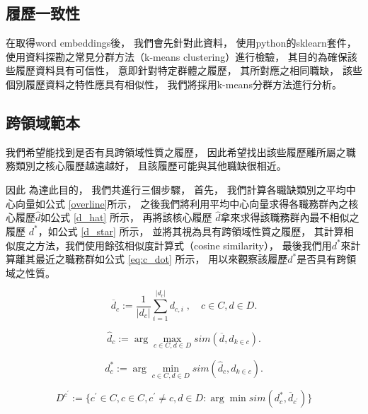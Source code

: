 \documentclass[acmsmall]{acmart}
\begin{document}
\subsection{履歷一致性}

在取得word embeddings後，
我們會先針對此資料，
使用python的sklearn\cite{sklearn_api}套件，
使用資料探勘之常見分群方法（k-means clustering）進行檢驗\cite{han2011data}，
其目的為確保該些履歷資料具有可信性，
意即針對特定群體之履歷，
其所對應之相同職缺，
該些個別履歷資料之特性應具有相似性，
我們將採用k-means分群方法\cite{macqueen1967some}進行分析。


\subsection{跨領域範本}

我們希望能找到是否有具跨領域性質之履歷，
因此希望找出該些履歷離所屬之職務類別之核心履歷越遠越好，
且該履歷可能與其他職缺很相近。

因此
為達此目的，
我們共進行三個步驟，
首先，
我們計算各職缺類別之平均中心向量如公式 \ref{overline}所示，
之後我們將利用平均中心向量求得各職務群內之核心履歷$\hat{d}$如公式 \ref{d_hat} 所示，
再將該核心履歷 $\hat{d}$拿來求得該職務群內最不相似之履歷 $d^{*}$，如公式 \ref{d_star} 所示，
並將其視為具有跨領域性質之履歷，
其計算相似度之方法，我們使用餘弦相似度計算式（cosine similarity）\cite{schutze2008introduction}，
最後我們用$d^{*}$來計算離其最近之職務群如公式 \ref{eq:c_dot} 所示，
用以來觀察該履歷$d^{*}$是否具有跨領域之性質。

\begin{equation}
    \label{overline}
    \overline{d}_c := \frac{1}{|d_{c}|}\sum_{i=1}^{|d_{c}|}{d_{c,i}}\;, \quad c\in C, d\in D.
\end{equation}

\begin{equation}
    \label{d_hat}
    \hat{d}_c := \arg \max_{c\in C, d\in D} sim(\overline{d}, d_{k \in c}).
\end{equation}

\begin{equation}
    \label{d_star}
    d^{*}_c := \arg \min_{c\in C, d\in D} sim(\hat{d}_c, d_{k \in c}).
\end{equation}

\begin{equation}
    \label{eq:c_dot}
    D^{c^{'}} := \{ c^{'}\in C, c\in C, c^{'} \neq c, d\in D : \arg \min sim(d^{*}_{c}, \overline{d}_{c^{'}}) \}
\end{equation}
\end{document}
